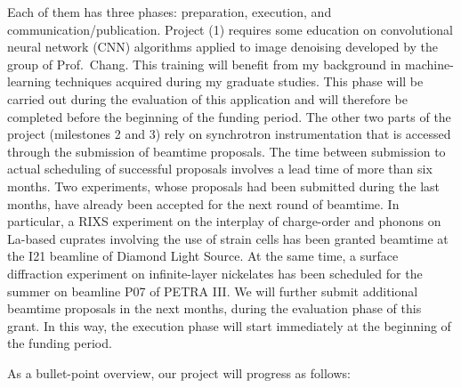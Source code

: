 \documentclass[a4paper, 12pt]{article}
\begin{document}
Each of them has three phases: preparation, execution, and communication/publication. 
Project (1) requires some education on convolutional neural network (CNN) algorithms applied to image denoising developed by the group of Prof.~Chang. This training will benefit from my background in machine-learning techniques acquired during my graduate studies. This phase will be carried out during the evaluation of this application and will therefore be completed before the beginning of the funding period. 
The other two parts of the project (milestones 2 and 3) rely on synchrotron instrumentation that is accessed through the submission of beamtime proposals. The time between submission to actual scheduling of successful proposals involves a lead time of more than six months. 
Two experiments, whose proposals had been submitted during the last months, have already been accepted for the next round of beamtime. In particular, a RIXS experiment on the interplay of charge-order and phonons on La-based cuprates involving the use of strain cells has been granted beamtime at the I21 beamline of Diamond Light Source. At the same time, a surface diffraction experiment on infinite-layer nickelates has been scheduled for the summer on beamline P07 of PETRA III.
We will further submit additional beamtime proposals in the next months, during the evaluation phase of this grant. In this way, the execution phase will start immediately at the beginning of the funding period.

As a bullet-point overview, our project will progress as follows:
\end{document}
